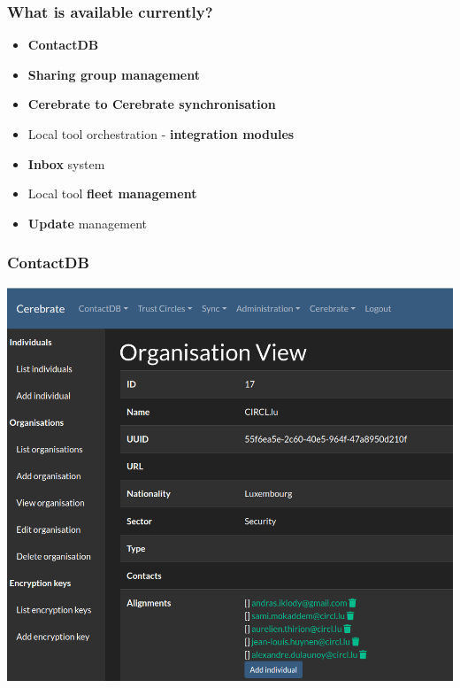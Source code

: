 \begin{frame}
	\frametitle{What is available currently?}
	\begin{itemize}
                \item {\bf ContactDB}
                \item {\bf Sharing group management}
                \item {\bf Cerebrate to Cerebrate synchronisation}
                \item Local tool orchestration - {\bf integration modules}
                \item {\bf Inbox} system
                \item Local tool {\bf fleet management}
                \item {\bf Update} management
	\end{itemize}
\end{frame}

\begin{frame}
\frametitle{ContactDB}
\begin{center}
    \includegraphics[scale=0.4]{org.png}
\end{center}
\end{frame}



